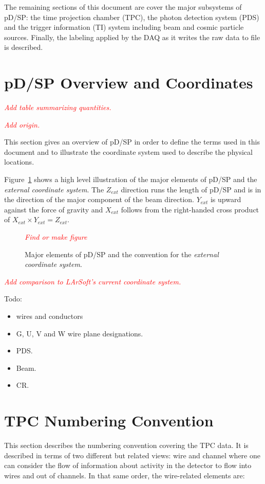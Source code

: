 \documentclass[letterpaper,twoside,onecolumn,article]{memoir}
\newcommand{\fixme}[1]{\textcolor{red}{\textit{#1}}}
\newcommand{\pD}{pD/SP\xspace}
\begin{document}
The remaining sections of this document are cover the major subsystems
of \pD: the time projection chamber (TPC), the photon detection system
(PDS) and the trigger information (TI) system including beam and
cosmic particle sources.  Finally, the labeling applied by the DAQ
as it writes the raw data to file is described.

\section{\pD Overview and Coordinates}

\fixme{Add table summarizing quantities.}

\fixme{Add origin.}

This section gives an overview of \pD in order to define the terms
used in this document and to illustrate the coordinate system used to
describe the physical locations.

Figure~\ref{fig:protodune} shows a high level illustration of the
major elements of \pD and the \textit{external coordinate system}.
The $Z_{ext}$ direction runs the length of \pD and is in the direction
of the major component of the beam direction.  $Y_{ext}$ is upward
against the force of gravity and $X_{ext}$ follows from the
right-handed cross product of $X_{ext} \times Y_{ext} = Z_{ext}$.

\begin{figure}[h]
  \centering
  \fixme{Find or make figure}
  \caption{Major elements of \pD and the convention for the \textit{external coordinate system}.}
  \label{fig:protodune}
\end{figure}


\fixme{Add comparison to LArSoft's current coordinate system.}


Todo:
\begin{itemize}
\item wires and conductors
\item G, U, V and W wire plane designations.
\item PDS.
\item Beam.
\item CR.
\end{itemize}

\section{TPC Numbering Convention}

This section describes the numbering convention covering the TPC data.
It is described in terms of two different but related views: wire and
channel where one can consider the flow of information about activity
in the detector to flow into wires and out of channels.  In that same
order, the wire-related elements are:
\end{document}
